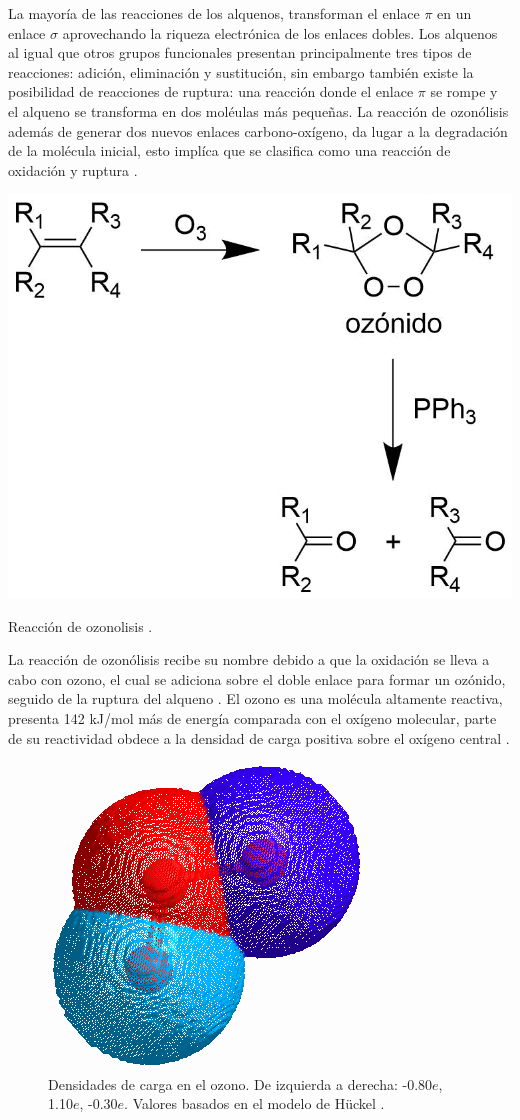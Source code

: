 \documentclass[fleqn,10pt]{SelfArx}
\begin{document}
La mayor\'ia de las reacciones de los alquenos, transforman el enlace $\pi$ en un enlace $\sigma$ aprovechando la riqueza electr\'onica de los enlaces dobles. Los alquenos al igual que otros grupos funcionales presentan principalmente tres tipos de reacciones: adici\'on, eliminaci\'on y sustituci\'on, sin embargo tambi\'en existe la posibilidad de reacciones de ruptura: una reacci\'on donde el enlace $\pi$ se rompe y el alqueno se transforma en dos mol\'eulas m\'as peque\~nas. La reacci\'on de ozon\'olisis adem\'as de generar dos nuevos enlaces carbono-ox\'igeno, da lugar a la degradaci\'on de la mol\'ecula inicial, esto impl\'ica que se clasifica como una reacci\'on de oxidaci\'on y ruptura \cite{Wade2013}\cite{Morrison2002}.
\begin{scheme}[h]
	\centering
	\includegraphics[width=0.7\linewidth]{structures/ozonolisis.png}
	\caption{Reacci\'on de ozonolisis \cite{Wade2013}.}
\end{scheme}

La reacci\'on de ozon\'olisis recibe su nombre debido a que la oxidaci\'on se lleva a cabo con ozono, el cual se adiciona sobre el doble enlace para formar un oz\'onido, seguido de la ruptura del alqueno \cite{Morrison2002}. El ozono es una mol\'ecula altamente reactiva, presenta 142 kJ/mol m\'as de energ\'ia comparada con el ox\'igeno molecular, parte de su reactividad obdece a la densidad de carga positiva sobre el ox\'igeno central \cite{Wade2013}.
\begin{figure}[h]
	\centering
	\includegraphics[width=0.4\linewidth]{structures/ozone.png}
	\caption{Densidades de carga en el ozono. De izquierda a derecha: -0.80$e$, 1.10$e$, -0.30$e$. Valores basados en el modelo de H\"uckel \cite{PerkinElmer}.}
\end{figure}
\end{document}
